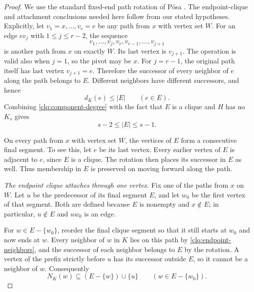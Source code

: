 \begin{proof}
We use the standard fixed-end path rotation of P\'osa
\cite[p.~358]{Posa1963}. The endpoint-clique and attachment conclusions
needed here follow from our stated hypotheses. Explicitly, let
$v_1=x,\ldots,v_r=e$ be any path from $x$ with vertex set $W$.
For an edge $ev_j$ with $1\le j\le r-2$, the sequence
\begin{equation}\label{clq:rotation}
 v_1,\ldots,v_j,v_r,v_{r-1},\ldots,v_{j+1}
\end{equation}
is another path from $x$ on exactly $W$.  Its last vertex is
$v_{j+1}$.  The operation is valid also when $j=1$, so the pivot
may be $x$.  For $j=r-1$, the original path itself has last vertex
$v_{j+1}=e$.  Therefore the successor of every neighbor of $e$
along the path belongs to $E$.  Different neighbors have different
successors, and hence
\begin{equation}\label{clq:endpoint-degree}
 d_K(e)\le |E| \qquad(e\in E).
\end{equation}
Combining \eqref{clq:component-degree} with the fact that $E$ is a
clique and $H$ has no $K_s$ gives
\begin{equation}\label{clq:endpoint-size}
 s-2\le |E|\le s-1.
\end{equation}

On every path from $x$ with vertex set $W$, the vertices of $E$ form
a consecutive final segment.  To see this, let $e$ be its last
vertex.  Every earlier vertex of $E$ is adjacent to $e$, since $E$
is a clique.  The rotation then places its successor in $E$ as well.
Thus membership in $E$ is preserved on moving forward along the path.

\medskip
\noindent\emph{The endpoint clique attaches through one vertex.}
Fix one of the paths from $x$ on $W$.  Let $u$ be the predecessor
of its final segment $E$, and let $w_0$ be the first vertex of that
segment.  Both are defined because $E$ is nonempty and $x\notin E$;
in particular, $u\notin E$ and $uw_0$ is an edge.

For $w\in E-\{w_0\}$, reorder the final clique segment so that it
still starts at $w_0$ and now ends at $w$.  Every neighbor of $w$
in $K$ lies on this path by \eqref{clq:endpoint-neighbors}, and
the successor of each neighbor belongs to $E$ by the rotation.
A vertex of the prefix strictly before $u$ has its successor outside
$E$, so it cannot be a neighbor of $w$.  Consequently
\begin{equation}\label{clq:partial-attachment}
 N_K(w)\subseteq (E-\{w\})\cup\{u\}
 \qquad(w\in E-\{w_0\}).
\end{equation}


\end{proof}
